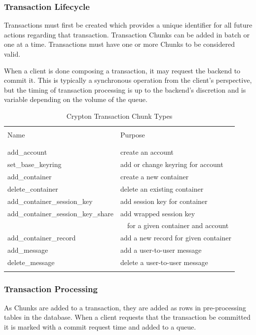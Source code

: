 \documentclass[conference]{IEEEtran}
\begin{document}
\subsubsection{Transaction Lifecycle}
Transactions must first be created which provides a unique identifier for
all future actions regarding that transaction. Transaction Chunks can be added
in batch or one at a time. Transactions must have one or more Chunks to be
considered valid.

When a client is done composing a transaction, it may request the backend
to commit it. This is typically a synchronous operation from the client's
perspective, but the timing of transaction processing is up to the backend's
discretion and is variable depending on the volume of the queue.

\begin{table}[ht]
\caption{Crypton Transaction Chunk Types}
\centering
\begin{tabular}{l l}
\hline\hline
\\ [0.1ex]
Name & Purpose \\
\\ [0.1ex]
\hline
\\ [0.3ex]
add\_account & create an account \\
set\_base\_keyring & add or change keyring for account \\
add\_container & create a new container \\
delete\_container & delete an existing container \\
add\_container\_session\_key & add session key for container \\
add\_container\_session\_key\_share & add wrapped session key \\ & \ \ for a
given container and account \\
add\_container\_record & add a new record for given container \\
add\_message & add a user-to-user message \\
delete\_message & delete a user-to-user message \\
\\ [0.3ex]
\hline
\end{tabular}
\label{table:nonlin}
\end{table}

\subsubsection{Transaction Processing}
As Chunks are added to a transaction, they are added as rows in
pre-processing tables in the database. When a client requests that the
transaction be committed it is marked with a commit request time and added
to a queue.
\end{document}
